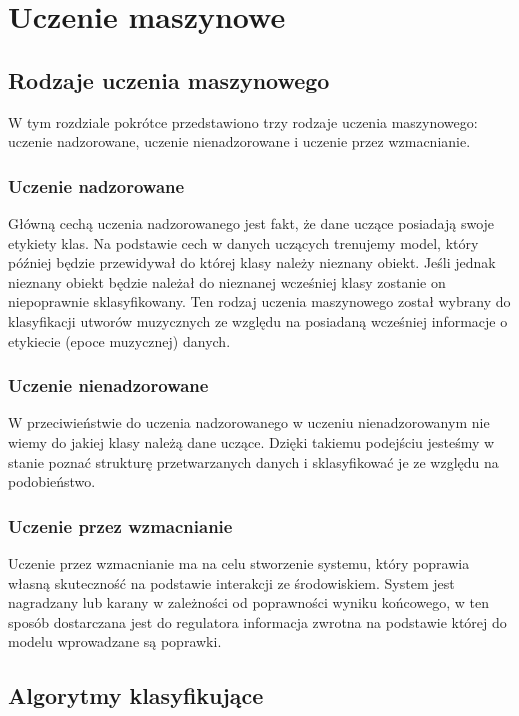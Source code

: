 \documentclass[printmode, eng, openany]{mgr}
\newcommand\tab[1][1cm]{\hspace*{#1}}
\begin{document}
\chapter{Uczenie maszynowe}
\section{Rodzaje uczenia maszynowego}
\tab W tym rozdziale pokrótce przedstawiono trzy rodzaje uczenia maszynowego: uczenie nadzorowane, uczenie nienadzorowane i uczenie przez wzmacnianie.
\subsection{Uczenie nadzorowane}
\tab Główną cechą uczenia nadzorowanego jest fakt, że dane uczące posiadają swoje etykiety klas. Na podstawie cech w danych uczących trenujemy model, który później będzie przewidywał do której klasy należy nieznany obiekt. Jeśli jednak nieznany obiekt będzie należał do nieznanej wcześniej klasy zostanie on niepoprawnie sklasyfikowany.
\tab Ten rodzaj uczenia maszynowego został wybrany do klasyfikacji utworów muzycznych ze względu na posiadaną wcześniej informacje o etykiecie (epoce muzycznej) danych.
\subsection{Uczenie nienadzorowane}
\tab W przeciwieństwie do uczenia nadzorowanego w uczeniu nienadzorowanym nie wiemy do jakiej klasy należą dane uczące. Dzięki takiemu podejściu jesteśmy w stanie poznać strukturę przetwarzanych danych i sklasyfikować je ze względu na podobieństwo. 
\subsection{Uczenie przez wzmacnianie}
\tab Uczenie przez wzmacnianie ma na celu stworzenie systemu, który poprawia własną skuteczność na podstawie interakcji ze środowiskiem. System jest nagradzany lub karany w zależności od poprawności wyniku końcowego, w ten sposób dostarczana jest do regulatora informacja zwrotna na podstawie której do modelu wprowadzane są poprawki.
\section{Algorytmy klasyfikujące}
\end{document}
